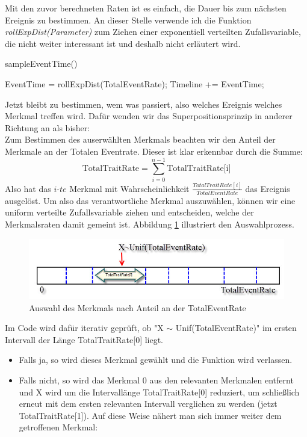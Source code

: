 \documentclass[11pt, a4paper, german]{article}
\theoremstyle{plain}
\begin{document}
	Mit den zuvor berechneten Raten ist es einfach, die Dauer bis zum nächsten Ereignis zu bestimmen. An dieser Stelle verwende ich die Funktion \textit{rollExpDist(Parameter)} zum Ziehen einer exponentiell verteilten Zufallsvariable, die nicht weiter interessant ist und deshalb nicht erläutert wird.
 	\begin{algorithm}[H]
 		\caption{sampleEventTime()}
 		\begin{algorithmic}[1]
 			\State EventTime = rollExpDist(TotalEventRate);
 			\State Timeline += EventTime;
 		\end{algorithmic}
 	\end{algorithm}
 	Jetzt bleibt zu bestimmen, wem was passiert, also welches Ereignis welches Merkmal treffen wird. Dafür wenden wir das Superpositionsprinzip in anderer Richtung an als bisher:\\
 	Zum Bestimmen des auserwählten Merkmals beachten wir den Anteil der Merkmale an der Totalen Eventrate. Dieser ist klar erkennbar durch die Summe:
 	\[ \text{TotalTraitRate} = \sum_{i = 0}^{n - 1} \text{TotalTraitRate[i]} \]
 	Also hat das $ i\text{-}te $ Merkmal mit Wahrscheinlichkeit $ \frac{TotalTraitRate[i]}{TotalEventRate} $ das Ereignis ausgelöst. Um also das verantwortliche Merkmal auszuwählen, können wir eine uniform verteilte Zufallsvariable ziehen und entscheiden, welche der Merkmalsraten damit gemeint ist. Abbildung \ref{SelectTrait} illustriert den Auswahlprozess.
 	\begin{figure}[H]
		\centering
		\includegraphics[width=1\linewidth]{./Pictures/SelectTrait}
		\caption[]{Auswahl des Merkmals nach Anteil an der TotalEventRate}
		\label{SelectTrait}
	\end{figure}
	Im Code wird dafür iterativ geprüft, ob "{}X $ \sim $ Unif(TotalEventRate)"{} im ersten Intervall der Länge TotalTraitRate[0] liegt. 
	\begin{itemize}
		\item[] Falls ja, so wird dieses Merkmal gewählt und die Funktion wird verlassen.
		\item[] Falls nicht, so wird das Merkmal $ 0 $ aus den relevanten Merkmalen entfernt und X wird um die Intervallänge TotalTraitRate[0] reduziert, um schließlich erneut mit dem ersten relevanten Intervall verglichen zu werden (jetzt TotalTraitRate[1]). Auf diese Weise nähert man sich immer weiter dem getroffenen Merkmal:
	\end{itemize}
\end{document}
